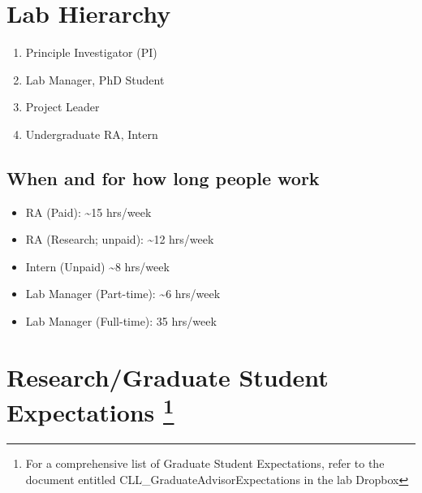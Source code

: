 \documentclass[
]{book}
\providecommand{\tightlist}{%
  \setlength{\itemsep}{0pt}\setlength{\parskip}{0pt}}
\begin{document}
\hypertarget{lab-hierarchy}{%
\section{Lab Hierarchy}\label{lab-hierarchy}}

\begin{enumerate}
\def\labelenumi{\arabic{enumi}.}
\tightlist
\item
  Principle Investigator (PI)
\item
  Lab Manager, PhD Student
\item
  Project Leader
\item
  Undergraduate RA, Intern
\end{enumerate}

\hypertarget{when-and-for-how-long-people-work}{%
\subsection{When and for how long people work}\label{when-and-for-how-long-people-work}}

\begin{itemize}
\tightlist
\item
  RA (Paid): \textasciitilde15 hrs/week
\item
  RA (Research; unpaid): \textasciitilde12 hrs/week
\item
  Intern (Unpaid) \textasciitilde8 hrs/week
\item
  Lab Manager (Part-time): \textasciitilde6 hrs/week
\item
  Lab Manager (Full-time): 35 hrs/week
\end{itemize}

\hypertarget{researchgraduate-student-expectations}{%
\section[Research/Graduate Student Expectations ]{\texorpdfstring{Research/Graduate Student Expectations \footnote{For a comprehensive list of Graduate Student Expectations, refer to the document entitled CLL\_GraduateAdvisorExpectations in the lab Dropbox}}{Research/Graduate Student Expectations }}\label{researchgraduate-student-expectations}}
\end{document}
